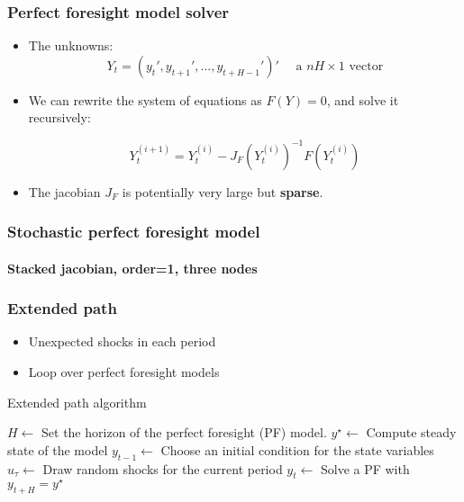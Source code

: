 \documentclass{beamer}
\begin{document}
\begin{frame}
  \frametitle{Perfect foresight model solver}

\begin{itemize}

    \item The unknowns:\newline
\[
    Y_t = (y_t', y_{t+1}',\ldots,y_{t+H-1}')' \quad\text{ a }nH\times 1\text{ vector}
  \]

   \bigskip

    \item We can rewrite the system of equations as $F(Y)=0$, and solve it recursively:\newline

\[
    Y_t^{(i+1)} = Y_t^{(i)} - J_F\left(Y_t^{(i)}\right)^{-1} F\left(Y_t^{(i)}\right)
  \]
\medskip

    \item The jacobian $J_F$ is potentially very large but \textbf{sparse}.

\end{itemize}

\end{frame}


\begin{frame}
  \frametitle{Stochastic perfect foresight model}
  \framesubtitle{Stacked jacobian, order=1, three nodes}
  \begin{center}
    \scalebox{.5}{
  }
  \end{center}
\end{frame}


\begin{frame}
  \frametitle{Extended path}

\begin{itemize}
    \item Unexpected shocks in each period\newline
    \item Loop over perfect foresight models\newline
\end{itemize}

\medskip

\begin{algorithm}[H]
  \caption{Extended path algorithm}
  \label{alg:ep}
  \begin{algorithmic}[1]
    \STATE $H \leftarrow$ Set the horizon of the perfect foresight (PF) model.
    \STATE $y^\star \leftarrow$ Compute steady state of the model
    \STATE $y_{t-1} \leftarrow$ Choose an initial condition for the state variables
    \STATE $u_\tau  \leftarrow$ Draw random shocks for the current period
    \STATE $y_t \leftarrow$ Solve a PF with $y_{t+H}=y^{\star}$
    \ENDFOR
  \end{algorithmic}
\end{algorithm}

\end{frame}
\end{document}
